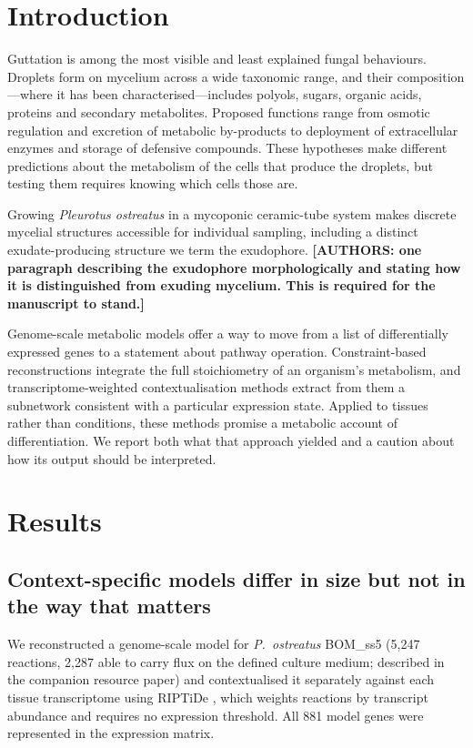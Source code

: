 \section{Introduction}

Guttation is among the most visible and least explained fungal behaviours. Droplets form on
mycelium across a wide taxonomic range, and their composition---where it has been
characterised---includes polyols, sugars, organic acids, proteins and secondary
metabolites. Proposed functions range from osmotic regulation and excretion of metabolic
by-products to deployment of extracellular enzymes and storage of defensive compounds. These
hypotheses make different predictions about the metabolism of the cells that produce the
droplets, but testing them requires knowing which cells those are.

Growing \textit{Pleurotus ostreatus} in a mycoponic ceramic-tube system
\cite{porterfield2026mycoponics} makes discrete mycelial structures accessible for individual
sampling, including a distinct exudate-producing structure we term the exudophore.
\textbf{[AUTHORS: one paragraph describing the exudophore morphologically and stating how it
is distinguished from exuding mycelium. This is required for the manuscript to stand.]}

Genome-scale metabolic models offer a way to move from a list of differentially expressed
genes to a statement about pathway operation. Constraint-based reconstructions integrate the
full stoichiometry of an organism's metabolism, and transcriptome-weighted contextualisation
methods extract from them a subnetwork consistent with a particular expression state. Applied
to tissues rather than conditions, these methods promise a metabolic account of
differentiation. We report both what that approach yielded and a caution about how its output
should be interpreted.

\section{Results}

\subsection{Context-specific models differ in size but not in the way that matters}

We reconstructed a genome-scale model for \textit{P.\ ostreatus} BOM\_ss5 (5,247 reactions,
2,287 able to carry flux on the defined culture medium; described in the companion resource
paper) and contextualised it separately against each tissue transcriptome using RIPTiDe \cite{jenior2020riptide}, which
weights reactions by transcript abundance and requires no expression threshold. All 881 model
genes were represented in the expression matrix.

